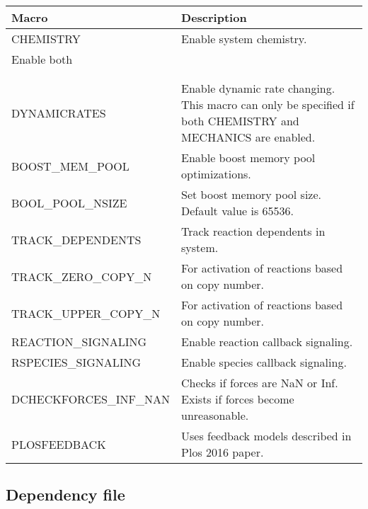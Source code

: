\documentclass[11pt, oneside]{article}   	%
\begin{document}
\small
\begin{table} [!ht]
\centering
\begin{tabular}{|L{5cm}|L{9cm}|}  
\hline
 \textbf{Macro} & \textbf{Description} \\
 \hline
  CHEMISTRY & Enable system chemistry. \\
  \hline
  Enable both\\
   &  \\ 
  \hline\hline
  
     &  \\ 
  \hline\hline
  DYNAMICRATES & Enable dynamic rate changing. This macro can only be specified if both CHEMISTRY and
  MECHANICS are enabled. \\
  \hline
  BOOST\_MEM\_POOL & Enable boost memory pool optimizations. \\
  \hline
   BOOL\_POOL\_NSIZE & Set boost memory pool size. Default value is 65536. \\
  \hline
   TRACK\_DEPENDENTS & Track reaction dependents in system. \\
  \hline
    TRACK\_ZERO\_COPY\_N & For activation of reactions based on copy number. \\
  \hline
     TRACK\_UPPER\_COPY\_N & For activation of reactions based on copy number. \\
  \hline
     REACTION\_SIGNALING & Enable reaction callback signaling. \\
  \hline
     RSPECIES\_SIGNALING & Enable species callback signaling.\\
  \hline
  DCHECKFORCES\_INF\_NAN & Checks if forces are NaN or Inf. Exists if forces become unreasonable.\\
  \hline
          PLOSFEEDBACK & Uses feedback models described in Plos 2016 paper.\\
  \hline
\end{tabular}
\end{table}
\normalsize

	
\subsection {Dependency file}
\end{document}

